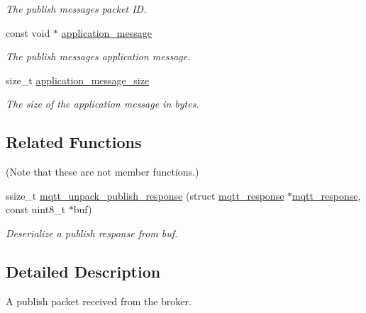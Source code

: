 \begin{DoxyCompactItemize}
\begin{DoxyCompactList}\small\item\em The publish message\textquotesingle{}s packet ID. \end{DoxyCompactList}\item 
const void $\ast$ \hyperlink{structmqtt__response__publish_ab62bd140a0f0ec6886a1397252faea52}{application\+\_\+message}\hypertarget{structmqtt__response__publish_ab62bd140a0f0ec6886a1397252faea52}{}\label{structmqtt__response__publish_ab62bd140a0f0ec6886a1397252faea52}

\begin{DoxyCompactList}\small\item\em The publish message\textquotesingle{}s application message. \end{DoxyCompactList}\item 
size\+\_\+t \hyperlink{structmqtt__response__publish_a01c5537d6478bff752f45d422ba47292}{application\+\_\+message\+\_\+size}\hypertarget{structmqtt__response__publish_a01c5537d6478bff752f45d422ba47292}{}\label{structmqtt__response__publish_a01c5537d6478bff752f45d422ba47292}

\begin{DoxyCompactList}\small\item\em The size of the application message in bytes. \end{DoxyCompactList}\end{DoxyCompactItemize}
\subsection*{Related Functions}
(Note that these are not member functions.) \begin{DoxyCompactItemize}
\item 
ssize\+\_\+t \hyperlink{group__unpackers_gae8ee6c1da210c4782f4f9939fe6ec828}{mqtt\+\_\+unpack\+\_\+publish\+\_\+response} (struct \hyperlink{structmqtt__response}{mqtt\+\_\+response} $\ast$\hyperlink{structmqtt__response}{mqtt\+\_\+response}, const uint8\+\_\+t $\ast$buf)
\begin{DoxyCompactList}\small\item\em Deserialize a publish response from {\ttfamily buf}. \end{DoxyCompactList}\end{DoxyCompactItemize}


\subsection{Detailed Description}
A publish packet received from the broker.

